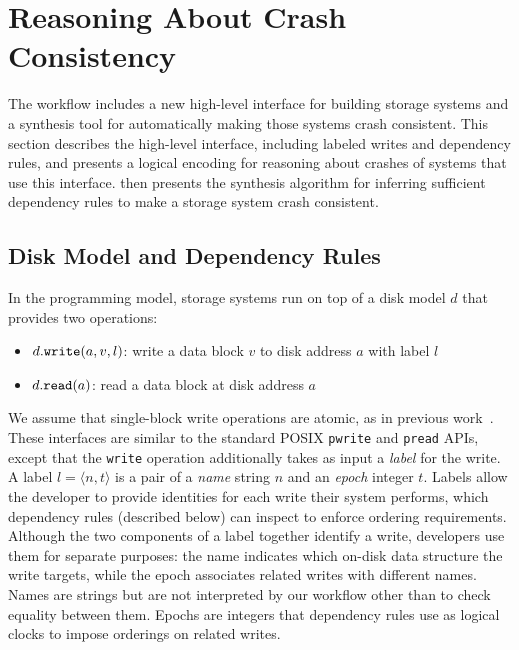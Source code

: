\section{Reasoning About Crash Consistency}\label{sec:problem}

The \depsynth workflow includes a new high-level interface for building storage systems
and a synthesis tool for automatically making those systems crash consistent.
This section describes the high-level interface,
including labeled writes and dependency rules,
and presents a logical encoding for reasoning about crashes of systems that use this interface.
 then presents the \depsynth synthesis algorithm for inferring
sufficient dependency rules to make a storage system crash consistent.\tighten

\subsection{Disk Model and Dependency Rules}\label{sec:problem:disk}

In the \depsynth programming model,
storage systems run on top of a disk model $d$ that provides two operations:
\begin{itemize}
\item $d.{\tt write}(a, v, l)$: write a data block $v$ to disk address $a$ with label $l$
\item $d.{\tt read}(a)$: read a data block at disk address $a$
\end{itemize}
We assume that single-block write operations are atomic, as in previous work~\cite{sigurbjarnarson:yggdrasil,chen:fscq}.
These interfaces are similar to the standard POSIX \texttt{pwrite} and \texttt{pread} APIs,
except that the \texttt{write} operation additionally takes as input a \emph{label} for the write.
A label $l = \langle n, t \rangle$ is a pair of a \emph{name} string $n$ and an \emph{epoch} integer $t$.
Labels allow the developer to provide identities for each write their system performs,
which dependency rules (described below) can inspect to enforce ordering requirements.
Although the two components of a label together identify a write,
developers use them for separate purposes:
the name indicates which on-disk data structure the write targets,
while the epoch associates related writes with different names.
Names are strings but are not interpreted by our workflow
other than to check equality between them.
Epochs are integers that dependency rules use as logical clocks to impose orderings on related writes.

